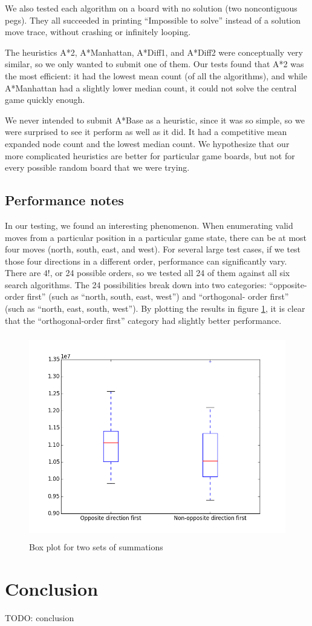 \documentclass[11pt]{article}
\begin{document}
We also tested each algorithm on a board with no solution (two noncontiguous pegs).
They all succeeded in printing ``Impossible to solve'' instead of a solution move
trace, without crashing or infinitely looping.

The heuristics A*2, A*Manhattan, A*Diff1, and A*Diff2 were conceptually very
similar, so we only wanted to submit one of them. Our tests found that A*2 was
the most efficient: it had the lowest mean count (of all the algorithms), and
while A*Manhattan had a slightly lower median count, it could not solve the
central game quickly enough.

We never intended to submit A*Base as a heuristic, since it was so simple, so we
were surprised to see it perform as well as it did. It had a competitive mean
expanded node count and the lowest median count. We hypothesize that our more
complicated heuristics are better for particular game boards, but not for every
possible random board that we were trying.

\subsection{Performance notes}

In our testing, we found an interesting phenomenon. When enumerating valid moves
from a particular position in a particular game state, there can be at most four
moves (north, south, east, and west). For several large test cases, if we test
those four directions in a different order, performance can significantly vary.
There are $4!$, or 24 possible orders, so we tested all 24 of them against all
six search algorithms. The 24 possibilities break down into two categories:
``opposite-order first'' (such as ``north, south, east, west'') and ``orthogonal-
order first'' (such as ``north, east, south, west''). By plotting the results in
figure \ref{fig_boxplot}, it is clear that the ``orthogonal-order first'' category
had slightly better performance.

\begin{figure}[h!]
\centering
\includegraphics[height=3.5in, width=4.5in]{figs/boxplot.png}
\caption{Box plot for two sets of summations}
\label{fig_boxplot}
\end{figure}

\section{Conclusion}

TODO: conclusion
\end{document}
